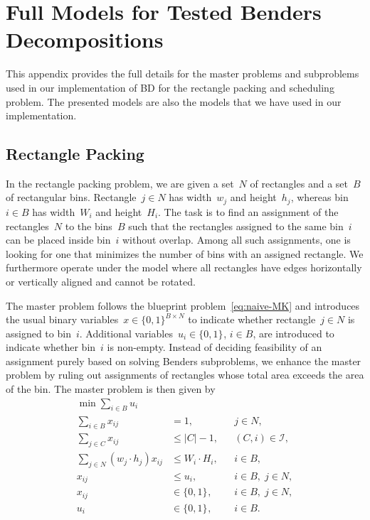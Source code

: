 \documentclass[a4paper,10pt]{article}
\newcommand{\B}[1]{\{0,1\}^{#1}}
\newcommand{\card}[1]{\left\lvert #1 \right\rvert}
\theoremstyle{definition}
\begin{document}
%
%

\newpage
\appendix

\section{Full Models for Tested Benders Decompositions}\label{appendix:MIPS}

This appendix provides the full details for the master problems and subproblems used in our implementation of BD for the rectangle packing and scheduling problem.
The presented models are also the models that we have used in our implementation.

\subsection{Rectangle Packing}\label{app:rectangle-packing}
In the rectangle packing problem, we are given a set~$N$ of rectangles and a set~$B$ of rectangular bins.
Rectangle~$j \in N$ has width~$w_j$ and height~$h_j$, whereas bin~$i \in B$ has width~$W_i$ and height~$H_i $.
The task is to find an assignment of the rectangles~$N$ to the bins~$B$ such that the rectangles assigned to the same bin~$i$ can be placed inside bin~$i$ without overlap.
Among all such assignments, one is looking for one that minimizes the number of bins with an assigned rectangle.
We furthermore operate under the model where all rectangles have edges horizontally or vertically aligned and cannot be rotated.

The master problem follows the blueprint problem~\eqref{eq:naive-MK} and introduces the usual binary variables~$x \in \B{B \times N}$ to indicate whether rectangle~$j \in N$ is assigned to bin~$i$.
Additional variables~$u_i \in \B{}$, $i \in B$, are introduced to indicate whether bin~$i$ is non-empty.
Instead of deciding feasibility of an assignment purely based on solving Benders subproblems, we enhance the master problem by ruling out assignments of rectangles whose total area exceeds the area of the bin.
The master problem is then given by
%
\begin{subequations}
  \label{eq:master-2DRP}
  \begin{align}
    \min \sum_{i \in B} u_i &&& \nonumber\\
    \sum_{i \in B} x_{ij} &= 1, && j \in N,\\
    \sum_{j \in C} x_{ij} &\leq \card{C} - 1, && (C,i) \in \mathcal{I},\\
    \sum_{j \in N} (w_j \cdot h_j) x_{ij} &\leq W_i\cdot H_i, && i \in B,\\
    x_{ij} &\leq u_i, && i \in B,\; j \in N,\\
    x_{ij} &\in \B{}, && i \in B,\; j \in N,\\
    u_i &\in \B{}, && i \in B.
  \end{align}
\end{subequations}
\end{document}
